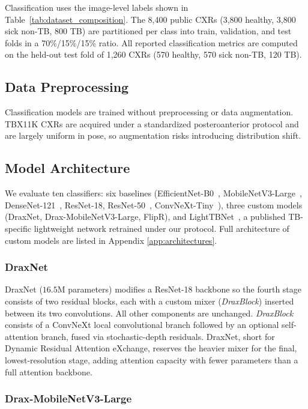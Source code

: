 \documentclass[conference, letterpaper]{IEEEtran}
\begin{document}
Classification uses the image-level labels shown in Table~\ref{tab:dataset_composition}. The 8,400 public CXRs (3,800 healthy, 3,800 sick non-TB, 800 TB) are partitioned per class into train, validation, and test folds in a 70\%/15\%/15\% ratio. All reported classification metrics are computed on the held-out test fold of 1,260 CXRs (570 healthy, 570 sick non-TB, 120 TB).

\subsection{Data Preprocessing}

Classification models are trained without preprocessing or data augmentation. TBX11K CXRs are acquired under a standardized posteroanterior protocol and are largely uniform in pose, so   augmentation risks introducing distribution shift.

\subsection{Model Architecture}

We evaluate ten classifiers: six baselines (EfficientNet-B0~\cite{tan2019efficientnet}, MobileNetV3-Large~\cite{howard2019mobilenetv3}, DenseNet-121~\cite{huang2017densenet}, ResNet-18, ResNet-50~\cite{he2016resnet}, ConvNeXt-Tiny~\cite{liu2022convnext}), three custom models (DraxNet, Drax-MobileNetV3-Large, FlipR), and LightTBNet~\cite{capellan2023lighttbnet}, a published TB-specific lightweight network retrained under our protocol. Full architecture of custom models are listed in Appendix \ref{app:architectures}.

\subsubsection{DraxNet}

DraxNet ($16.5$M parameters) modifies a ResNet-18 backbone so the fourth stage consists of two residual blocks, each with a custom mixer (\emph{DraxBlock}) inserted between its two convolutions. All other components are unchanged. \emph{DraxBlock} consists of a ConvNeXt local convolutional branch followed by an optional self-attention branch, fused via stochastic-depth residuals. DraxNet, short for Dynamic Residual Attention eXchange, reserves the heavier mixer for the final, lowest-resolution stage, adding attention capacity with fewer parameters than a full attention backbone.

\subsubsection{Drax-MobileNetV3-Large}
\end{document}
